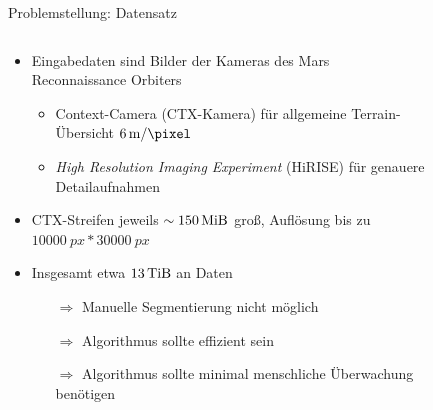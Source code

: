 \documentclass[9pt]{beamer}
\begin{document}
\begin{frame}{Problemstellung: Datensatz}
\begin{columns}
	\begin{column}{.7\textwidth}
		\begin{itemize}
			\item Eingabedaten sind Bilder der Kameras des Mars Reconnaissance Orbiters
			\begin{itemize}
				\item \alert{Context-Camera (CTX-Kamera) für allgemeine Terrain-Übersicht $\SI{6}{\meter\per\pixel}$}
				\item \textit{High Resolution Imaging Experiment} (HiRISE) für genauere Detailaufnahmen
			\end{itemize}
			\item CTX-Streifen jeweils $\sim\SI{150}{\mebi\byte}$ groß, Auflösung bis zu $\SI{10000}{px}*\SI{30000}{px}$
			\item Insgesamt etwa $\SI{13}{\tebi\byte}$ an Daten
			\begin{itemize}
				\item[$\Rightarrow$] Manuelle Segmentierung nicht möglich
				\item[$\Rightarrow$] Algorithmus sollte effizient sein
				\item[$\Rightarrow$] Algorithmus sollte minimal menschliche Überwachung benötigen
			\end{itemize}
		\end{itemize}
	\end{column}
	\begin{column}{.3\textwidth}
		\begin{figure}[H]

\end{figure}
\end{column}
\end{columns}
\end{frame}
\end{document}
